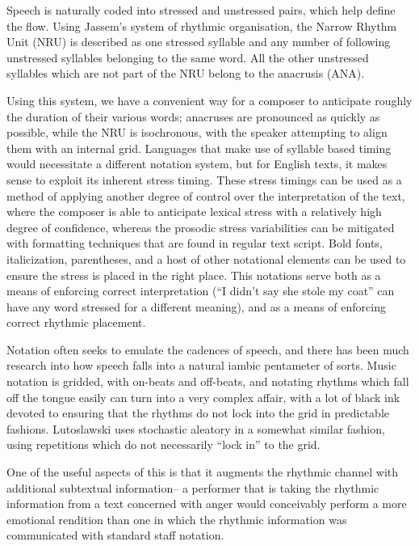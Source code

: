 Speech is naturally coded into stressed and unstressed pairs, which help define the flow. 
Using Jassem's system of rhythmic organisation, the Narrow Rhythm Unit (NRU) is described as one stressed syllable and any number of following unstressed syllables belonging to the same word.\autocite[]{hillResultsPreliminaryStudy1977}
All the other unstressed syllables which are not part of the NRU belong to the anacrusis (ANA). 

Using this system, we have a convenient way for a composer to anticipate roughly the duration of their various words; anacruses are pronounced as quickly as possible, while the NRU is isochronous, with the speaker attempting to align them with an internal grid. 
Languages that make use of syllable based timing would necessitate a different notation system, but for English texts, it makes sense to exploit its inherent stress timing. 
These stress timings can be used as a method of applying another degree of control over the interpretation of the text, where the composer is able to anticipate lexical stress with a relatively high degree of confidence, whereas the prosodic stress variabilities can be mitigated with formatting techniques that are found in regular text script.
Bold fonts, italicization, parentheses, and a host of other notational elements can be used to ensure the stress is placed in the right place. 
This notations serve both as a means of enforcing correct interpretation (``I didn't say she stole my coat'' can have any word stressed for a different meaning), and as a means of enforcing correct rhythmic placement.

Notation often seeks to emulate the cadences of speech, and there has been much research into how speech falls into a natural iambic pentameter of sorts. 
Music notation is gridded, with on-beats and off-beats, and notating rhythms which fall off the tongue easily can turn into a very complex affair, with a lot of black ink devoted to ensuring that the rhythms do not lock into the grid in predictable fashions. 
Lutoslawski uses stochastic aleatory in a somewhat similar fashion, using repetitions which do not necessarily ``lock in'' to the grid.

One of the useful aspects of this is that it augments the rhythmic channel with additional subtextual information-- a performer that is taking the rhythmic information from a text concerned with anger would conceivably perform a more emotional rendition than one in which the rhythmic information was communicated with standard staff notation.

